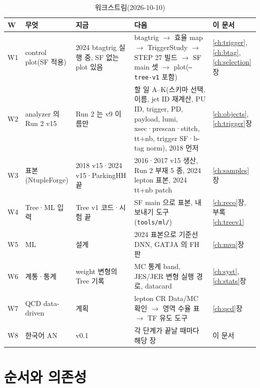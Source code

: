 \begin{table}[htbp]\centering
\caption{워크스트림(2026-10-10)}\label{tab:plan-ws}
\footnotesize
\begin{tabularx}{\linewidth}{@{}l >{\raggedright\arraybackslash}p{2.9cm} L L >{\raggedright\arraybackslash}p{2.0cm}@{}}
\toprule
W & 무엇 & 지금 & 다음 & 이 문서 \\
\midrule
W1 & control plot(SF 적용) & 2024 btagtrig 실행 중, SF 없는 plot 있음 & btagtrig $\to$ 효율 map $\to$ TriggerStudy $\to$ STEP 27 빌드 $\to$ SF main 셋 $\to$ plot(\texttt{--tree-v1} 포함) & \ref{ch:trigger}, \ref{ch:btag}, \ref{ch:selection}장 \\
W2 & analyzer 의 Run 2 v15 & Run 2 는 v9 이름만 & 할 일 A–K(스키마 선택, 이름, jet ID 재계산, PU ID, trigger, PD, payload, lumi, xsec·prescan·stitch, tt+nb, trigger SF·b-tag norm), 2018 먼저 & \ref{ch:objects}, \ref{ch:trigger}장 \\
W3 & 표본(NtupleForge) & 2018 v15·2024 v15·ParkingHH 끝 & 2016·2017 v15 생산, Run 2 부재 5 종, 2024 lepton 표본, 2024 tt+nb patch & \ref{ch:samples}장 \\
W4 & Tree·ML 입력 & Tree v1 코드·시험 끝 & SF main 으로 표본, 내보내기 도구(\texttt{tools/ml/}) & \ref{ch:reco}장, 부록 \ref{ch:treev1} \\
W5 & ML & 설계 & 2024 표본으로 기준선 DNN, GATJA 의 FH 판 & \ref{ch:mva}장 \\
W6 & 계통·통계 & weight 변형의 Tree 기록 & MC 통계 band, JES/JER 변형 실행 경로, datacard & \ref{ch:syst}, \ref{ch:stats}장 \\
W7 & QCD data-driven & 계획 & lepton CR Data/MC 확인 $\to$ 영역 수율 표 $\to$ TF 유도 도구 & \ref{ch:qcd}장 \\
W8 & 한국어 AN & v0.1 & 각 단계가 끝날 때마다 해당 장 & 이 문서 \\
\bottomrule
\end{tabularx}
\end{table}

\section{순서와 의존성}\label{sec:plan-order}

